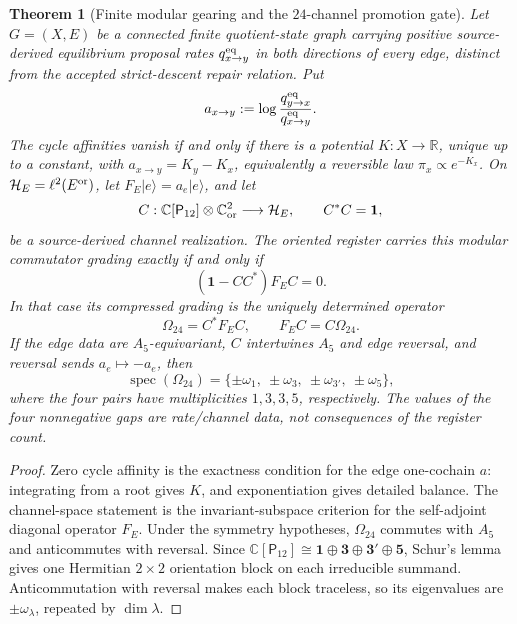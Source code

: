\documentclass[11pt]{article}
\newtheorem{theorem}{Theorem}[section]
\begin{document}
\begin{theorem}[Finite modular gearing and the \(24\)-channel promotion gate]
\label{thm:finite-modular-gearing}
Let \(G=(X,E)\) be a connected finite quotient-state graph carrying positive
source-derived equilibrium proposal rates \(q_{x\to y}^{\rm eq}\) in both
directions of every edge, distinct from the accepted strict-descent repair
relation.  Put
\[
a_{x\to y}:=\log\frac{q_{y\to x}^{\rm eq}}{q_{x\to y}^{\rm eq}}.
\]
The cycle affinities vanish if and only if there is a potential
\(K:X\to\mathbb R\), unique up to a constant, with
\(a_{x\to y}=K_y-K_x\), equivalently a reversible law
\(\pi_x\propto e^{-K_x}\).  On
\(\mathcal H_E=\ell^2(E^{\rm or})\), let
\(F_E|e\rangle=a_e|e\rangle\), and let
\[
C:\mathbb C[\mathsf P_{12}]\otimes\mathbb C^2_{\rm or}
  \longrightarrow \mathcal H_E,
\qquad C^*C=\mathbf1,
\]
be a source-derived channel realization.  The oriented register carries this
modular commutator grading exactly if and only if
\[
(\mathbf1-CC^*)F_EC=0.
\]
In that case its compressed grading is the uniquely determined operator
\[
\Omega_{24}=C^*F_EC,
\qquad F_EC=C\Omega_{24}.
\]
If the edge data are \(A_5\)-equivariant, \(C\) intertwines \(A_5\) and edge
reversal, and reversal sends \(a_e\mapsto-a_e\), then
\[
\operatorname{spec}(\Omega_{24})
=
\{\pm\omega_1,\ \pm\omega_3,\ \pm\omega_{3'},\ \pm\omega_5\},
\]
where the four pairs have multiplicities \(1,3,3,5\), respectively.
The values of the four nonnegative gaps are rate/channel data, not consequences
of the register count.
\end{theorem}

\begin{proof}
Zero cycle affinity is the exactness condition for the edge one-cochain \(a\):
integrating from a root gives \(K\), and exponentiation gives detailed balance.
The channel-space statement is the invariant-subspace criterion for the
self-adjoint diagonal operator \(F_E\).  Under the symmetry hypotheses,
\(\Omega_{24}\) commutes with \(A_5\) and anticommutes with reversal.  Since
\(\mathbb C[\mathsf P_{12}]\cong\mathbf1\oplus\mathbf3\oplus\mathbf3'\oplus\mathbf5\),
Schur's lemma gives one Hermitian \(2\times2\) orientation block on each
irreducible summand.  Anticommutation with reversal makes each block traceless,
so its eigenvalues are \(\pm\omega_\lambda\), repeated by
\(\dim\lambda\).
\end{proof}
\end{document}
